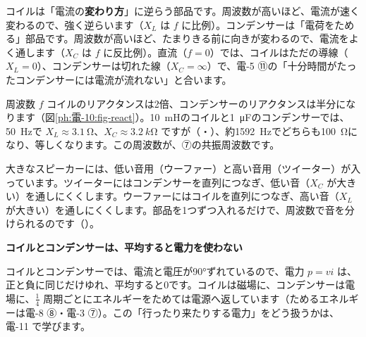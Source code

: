 \begin{phyomi}[$X_L=\omega L$、$X_C=\dfrac{1}{\omega C}$]
コイルは「電流の\textbf{変わり方}」に逆らう部品です。周波数が高いほど、電流が速く変わるので、強く逆らいます（$X_L$ は $f$ に比例）。コンデンサーは「電荷をためる」部品です。周波数が高いほど、たまりきる前に向きが変わるので、電流をよく通します（$X_C$ は $f$ に反比例）。直流（$f=0$）では、コイルはただの導線（$X_L=0$）、コンデンサーは切れた線（$X_C=\infty$）で、電-5 ⑪の「十分時間がたったコンデンサーには電流が流れない」と合います。
\end{phyomi}

\begin{phbaisuru}{周波数 $f$}
コイルのリアクタンスは2倍、コンデンサーのリアクタンスは半分になります（図\ref{ph:電-10:fig-react}）。\qty{10}{mH}のコイルと\qty{1}{\micro F}のコンデンサーでは、\qty{50}{Hz}で $X_L\approx\qty{3.1}{\ohm}$、$X_C\approx\qty{3.2}{k\ohm}$ ですが（・）、約\qty{1592}{Hz}でどちらも\qty{100}{\ohm}になり、等しくなります。この周波数が、⑦の共振周波数です。
\end{phbaisuru}

\begin{phmijika}
大きなスピーカーには、低い音用（ウーファー）と高い音用（ツイーター）が入っています。ツイーターにはコンデンサーを直列につなぎ、低い音（$X_C$ が大きい）を通しにくくします。ウーファーにはコイルを直列につなぎ、高い音（$X_L$ が大きい）を通しにくくします。部品を1つずつ入れるだけで、周波数で音を分けられるのです（）。
\end{phmijika}

\noindent\textbf{コイルとコンデンサーは、平均すると電力を使わない}\par\nobreak
コイルとコンデンサーでは、電流と電圧が90°ずれているので、電力 $p=vi$ は、正と負に同じだけゆれ、平均すると0です。コイルは磁場に、コンデンサーは電場に、$\tfrac14$ 周期ごとにエネルギーをためては電源へ返しています（ためるエネルギーは電-8 ⑧・電-3 ⑦）。この「行ったり来たりする電力」をどう扱うかは、電-11 で学びます。


